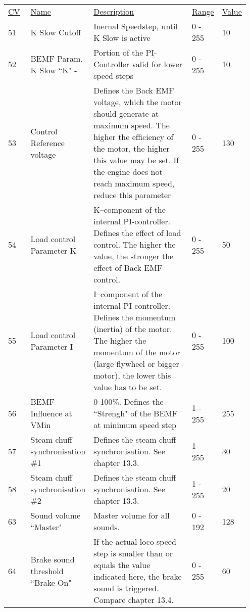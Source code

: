 \begin{tabular}{p{0.1\linewidth} p{0.15\linewidth} p{0.5\linewidth} p{0.1\linewidth} p{0.1\linewidth}} 
\underline{CV} & \underline{Name} &  \underline{Description} & \underline{Range} & \underline{Value}\\

51 & K Slow Cutoff & Inernal Speedstep, until K Slow is active & 0 - 255 & 10\\
52 & BEMF Param. K Slow ``K" -& Portion of the PI-Controller valid for lower speed steps & 0 - 255 & 10\\
53 & Control Reference voltage & Defines the Back EMF voltage, which the motor should generate at maximum speed. The higher the efficiency of the motor, the higher this value may be set. If the engine does not reach maximum speed, reduce this parameter & 0 - 255 & 130\\
54 & Load control Parameter K & K–component of the internal PI-controller. Defines the effect of load control. The higher the value, the stronger the effect of Back EMF control. & 0 - 255 & 50\\
55 & Load control Parameter I  & I–component of the internal PI-controller. Defines the momentum (inertia) of the motor. The higher the momentum of the motor (large flywheel or bigger motor), the lower this value has to be set. & 0 - 255 & 100\\
56 & BEMF Influence at VMin & 0-100\%. Defines the ``Strengh" of the BEMF at minimum speed step & 1 - 255 & 255\\
57 & Steam chuff synchronisation \#1 & Defines the steam chuff synchronisation. See chapter 13.3. & 1 - 255 & 30\\
58 & Steam chuff synchronisation \#2 & Defines the steam chuff synchronisation. See chapter 13.3. & 1 - 255 & 20\\
63 & Sound volume ``Master" & Master volume for all sounds. & 0 - 192 & 128\\
64 & Brake sound threshold ``Brake On" & If the actual loco speed step is smaller than or equals the value indicated here, the brake sound is triggered. Compare chapter 13.4. & 0 - 255 & 60\\
\end{tabular}
